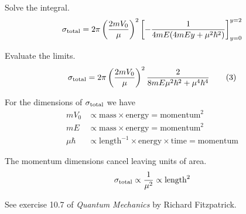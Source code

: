 Solve the integral.
\begin{equation*}
\sigma_{\rm total}=2\pi\left(\frac{2mV_0}{\mu}\right)^2
\left[-\frac{1}{4mE(4mEy+\mu^2\hbar^2)}\right]_{y=0}^{y=2}
\end{equation*}

Evaluate the limits.
\begin{equation*}
\sigma_{\rm total}=2\pi\left(\frac{2mV_0}{\mu}\right)^2
\frac{2}{8mE\mu^2\hbar^2+\mu^4\hbar^4}
\tag{3}
\end{equation*}

For the dimensions of $\sigma_{\rm total}$ we have
\begin{align*}
mV_0&\propto\text{mass}\times\text{energy}=\text{momentum}^2
\\
mE&\propto\text{mass}\times\text{energy}=\text{momentum}^2
\\
\mu\hbar&\propto\text{length}^{-1}\times\text{energy}\times\text{time}=\text{momentum}
\end{align*}

The momentum dimensions cancel leaving units of area.
\begin{equation*}
\sigma_{\rm total}\propto\frac{1}{\mu^2}\propto\text{length}^2
\end{equation*}

See exercise 10.7 of {\it Quantum Mechanics} by Richard Fitzpatrick.


